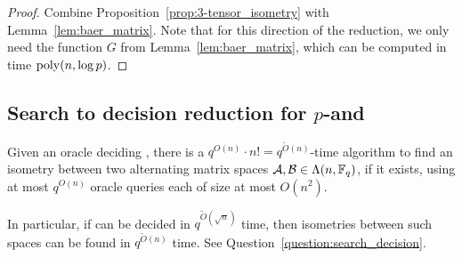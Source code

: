 \documentclass[11pt]{article}
\begin{document}
\begin{proof}
Combine Proposition~\ref{prop:3-tensor_isometry} with Lemma~\ref{lem:baer_matrix}. Note that for this direction of the reduction, we only need the function $G$ from Lemma~\ref{lem:baer_matrix}, which can be computed in time $\mathrm{poly}(n,\log p)$.
\end{proof}


\subsection{Search to decision reduction for $p$-\GpIlong and \AltMatSpIsomlong}

\begin{thmsearch}
Given an oracle deciding \AltMatSpIsomlong, there is a 
$q^{O(n)}\cdot n!=q^{\tilde{O}(n)}$-time algorithm to find an 
isometry between two alternating matrix spaces $\mathcal{A}, \mathcal{B} \in 
\Lambda(n, \mathbb{F}_q)$, if it exists, using at most $q^{O(n)}$ 
oracle queries each of size at most $O(n^2)$. 
\end{thmsearch}

In particular, if \AltMatSpIsomlong can be decided in 
$q^{\tilde{O}(\sqrt{n})}$ time, then isometries between such 
spaces can be found in $q^{\tilde{O}(n)}$ time. See Question~\ref{question:search_decision}.
\end{document}
